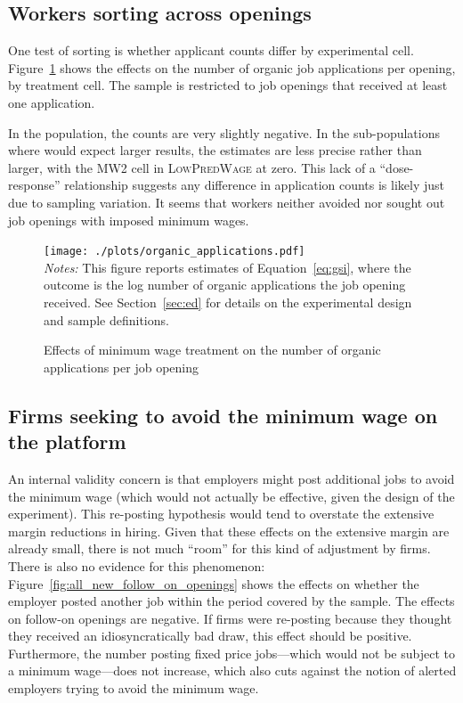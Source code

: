 \documentclass[AER]{AEA}
\newcommand{\lpw}{\textsc{LowPredWage}}
\begin{document}
\subsection{Workers sorting across openings}  \label{sec:workers_sorting} 
One test of sorting is whether applicant counts differ by experimental cell.
Figure~\ref{fig:all_new_organic_applications} shows the effects on the number of organic job applications per opening, by treatment cell. 
The sample is restricted to job openings that received at least one application.  

In the population, the counts are very slightly negative.
In the sub-populations where would expect larger results, the estimates are less precise rather than larger, with the MW2 cell in \lpw{} at zero.
This lack of a ``dose-response'' relationship suggests any difference in application counts is likely just due to sampling variation.
It seems that workers neither avoided nor sought out job openings with imposed minimum wages.  

\begin{figure}[h!]
  \caption{Effects of minimum wage treatment on the number of organic applications per job opening} \label{fig:all_new_organic_applications}
  \centering
  \begin{minipage}{0.99\textwidth}
    \texttt{[image: ./plots/organic\_applications.pdf]}
{\footnotesize \\
  \emph{Notes:} This figure reports estimates of Equation~\ref{eq:gsi}, where the outcome is the log number of organic applications the job opening received. 
  See Section~\ref{sec:ed} for details on the experimental design and sample definitions.  
}
\end{minipage} 
\end{figure}

\subsection{Firms seeking to avoid the minimum wage on the platform} \label{sec:firm_sorting_time}
An internal validity concern is that employers might post additional jobs to avoid the minimum wage (which would not actually be effective, given the design of the experiment).
This re-posting hypothesis would tend to overstate the extensive margin reductions in hiring.
Given that these effects on the extensive margin are already small, there is not much ``room'' for this kind of adjustment by firms.
There is also no evidence for this phenomenon:
Figure~\ref{fig:all_new_follow_on_openings} shows the effects on whether the employer posted another job within the period covered by the sample.
The effects on follow-on openings are negative. 
If firms were re-posting because they thought they received an idiosyncratically bad draw, this effect should be positive.
Furthermore, the number posting fixed price jobs---which would not be subject to a minimum wage---does not increase, which also cuts against the notion of alerted employers trying to avoid the minimum wage.
\end{document}
